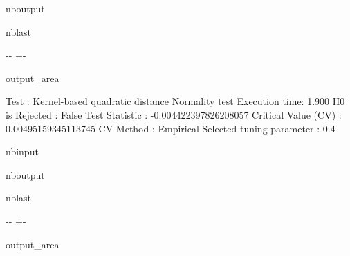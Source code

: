 \documentclass[letterpaper,10pt,english,openany,oneside]{sphinxmanual}
\begin{document}
{{{{\begin{sphinxuseclass}{nboutput}
\begin{sphinxuseclass}{nblast}
{\kern-\sphinxverbatimsmallskipamount\kern-\baselineskip
\kern+\FrameHeightAdjust\kern-\fboxrule
\vspace{\nbsphinxcodecellspacing}

\begin{sphinxuseclass}{output_area}
\begin{sphinxuseclass}{}


\begin{sphinxVerbatim}[commandchars=\\\{\}]
Test : Kernel-based quadratic distance Normality test
Execution time: 1.900
H0 is Rejected : False
Test Statistic : -0.004422397826208057
Critical Value (CV) : 0.00495159345113745
CV Method : Empirical
Selected tuning parameter : 0.4
\end{sphinxVerbatim}



\end{sphinxuseclass}
\end{sphinxuseclass}
}

\end{sphinxuseclass}
\end{sphinxuseclass}
\begin{sphinxuseclass}{nbinput}
{
\begin{sphinxVerbatim}[commandchars=\\\{\}]
\llap{\color{nbsphinxin}[3]:\,\hspace{\fboxrule}\hspace{\fboxsep}}
\end{sphinxVerbatim}
}

\end{sphinxuseclass}
\begin{sphinxuseclass}{nboutput}
\begin{sphinxuseclass}{nblast}
{

\kern-\sphinxverbatimsmallskipamount\kern-\baselineskip
\kern+\FrameHeightAdjust\kern-\fboxrule
\vspace{\nbsphinxcodecellspacing}

\begin{sphinxuseclass}{output_area}
\begin{sphinxuseclass}{}



\end{sphinxuseclass}
\end{sphinxuseclass}}
\end{sphinxuseclass}
\end{sphinxuseclass}}}}}
\end{document}
